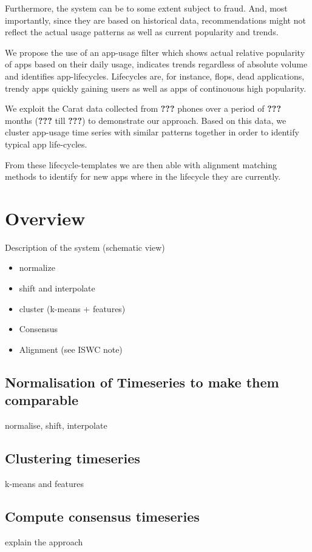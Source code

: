 \documentclass{sigchi}
\begin{document}
Furthermore, the system can be to some extent subject to fraud. 
And, most importantly, since they are based on historical data, recommendations might not reflect the actual usage patterns as well as current popularity and trends.

We propose the use of an app-usage filter which shows actual relative popularity of apps based on their daily usage, indicates trends regardless of absolute volume and identifies app-lifecycles. 
Lifecycles are, for instance, flops, dead applications, trendy apps quickly gaining users as well as apps of continouous high popularity. 

We exploit the Carat data \textbf{\cite{???}} collected from \textbf{???} phones over a period of \textbf{???} months (\textbf{???} till \textbf{???}) to demonstrate our approach.
Based on this data, we cluster app-usage time series with similar patterns together in order to identify typical app life-cycles.

From these lifecycle-templates we are then able with alignment matching methods to identify for new apps where in the lifecycle they are currently.



\section{Overview}

Description of the system (schematic view)
\begin{itemize}
 \item normalize
 \item shift and interpolate
 \item cluster (k-means + features)
 \item Consensus
 \item Alignment (see ISWC note)
\end{itemize}
\subsection{Normalisation of Timeseries to make them comparable}
normalise, shift, interpolate
\subsection{Clustering timeseries}
k-means and features
\subsection{Compute consensus timeseries}
explain the approach
\end{document}
